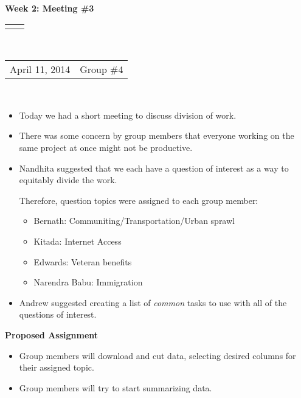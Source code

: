 \documentclass[12pt]{article}
\renewcommand{\title}[1]{\textbf{#1}\\}
\renewcommand{\line}{\begin{tabularx}{\textwidth}{X>{\raggedleft}X}\hline\\\end{tabularx}\\[-0.5cm]}
\newcommand{\leftright}[2]{\begin{tabularx}{\textwidth}{X>{\raggedleft}X}#1%
& #2\\\end{tabularx}\\[-0.5cm]}
\begin{document}
\title{Week 2: Meeting \#3 }
\line
\leftright{April 11, 2014}{Group \#4} %
\vspace{5mm}

\begin{itemize}
\item Today we had a short meeting to discuss division of work. 
\item There was some concern by group members that everyone working on the same project at once might not be productive. 
\item Nandhita suggested that we each have a question of interest as a way to equitably divide the work. 

Therefore, question topics  were assigned to each group member: 
\begin{itemize}
\item Bernath: Communiting/Transportation/Urban sprawl
\item Kitada: Internet Access
\item Edwards: Veteran benefits 
\item Narendra Babu: Immigration
\end{itemize}

\item Andrew suggested creating a list of \emph{common} tasks to use with all of the questions of interest. 
\end{itemize}

\textbf{Proposed Assignment}
\begin{itemize}
\item Group members will download and cut data, selecting desired columns for their assigned topic.
\item Group members will try to start summarizing data. 
\end{itemize}





\end{document}
